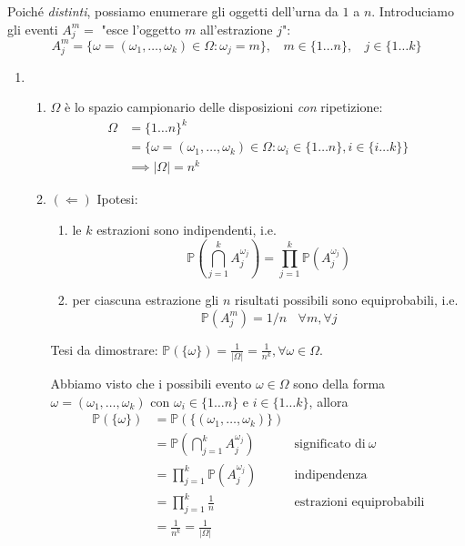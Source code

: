 Poiché \textit{distinti}, possiamo enumerare gli oggetti dell'urna da $1$ a $n$. Introduciamo gli eventi $A_{j}^{m} =$ "esce l'oggetto $m$ all'estrazione $j$":
\begin{equation*}
A_{j}^{m} =\{\omega =( \omega _{1} ,\dots ,\omega _{k}) \in \Omega :\omega _{j} =m\} ,\ \ \ \ m\in \{1\dots n\} ,\ \ \ \ j\in \{1\dots k\}
\end{equation*}
\begin{enumerate}
\item 
\begin{enumerate}
\item $\Omega $ è lo spazio campionario delle disposizioni \textit{con} ripetizione:\begin{equation*}
\begin{aligned}
\Omega  & =\{1\dots n\}^{k}\\
 & =\{\omega =( \omega _{1} ,\dots ,\omega _{k}) \in \Omega :\omega _{i} \in \{1\dots n\} ,i\in \{i\dots k\}\}\\
 & \implies | \Omega | =n^{k}
\end{aligned}
\end{equation*}
\item $( \Leftarrow )$ Ipotesi:
\begin{enumerate}
\item le $k$ estrazioni sono indipendenti, i.e.\begin{equation*}
\mathbb{P}\left(\bigcap _{j=1}^{k} A_{j}^{\omega _{j}}\right) =\prod _{j=1}^{k}\mathbb{P}\left( A_{j}^{\omega _{j}}\right)
\end{equation*}
\item per ciascuna estrazione gli $n$ risultati possibili sono equiprobabili, i.e.\begin{equation*}
\mathbb{P}\left( A_{j}^{m}\right) =1/n\ \ \ \ \forall m,\forall j
\end{equation*}
\end{enumerate}

Tesi da dimostrare: $\mathbb{P}(\{\omega \}) =\frac{1}{| \Omega | } =\frac{1}{n^{k}} ,\forall \omega \in \Omega $.

Abbiamo visto che i possibili evento $\omega \in \Omega $ sono della forma $\omega =( \omega _{1} ,\dots ,\omega _{k})$ con $\omega _{i} \in \{1\dots n\}$ e $i\in \{1\dots k\}$, allora\begin{equation*}
\begin{aligned}
\mathbb{P}(\{\omega \}) & =\mathbb{P}(\{( \omega _{1} ,\dots ,\omega _{k})\}) & \\
 & =\mathbb{P}\left(\bigcap _{j=1}^{k} A_{j}^{\omega _{j}}\right) & \text{significato di} \ \omega \\
 & =\prod _{j=1}^{k}\mathbb{P}\left( A_{j}^{\omega _{j}}\right) & \text{indipendenza}\\
 & =\prod _{j=1}^{k}\frac{1}{n} & \text{estrazioni equiprobabili}\\
 & =\frac{1}{n^{k}} =\frac{1}{| \Omega | } & 
\end{aligned}
\end{equation*}


\end{enumerate}
\end{enumerate}
